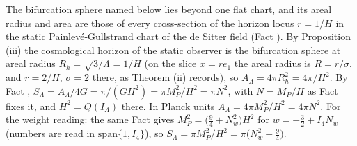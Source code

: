 The bifurcation sphere named below lies beyond one flat chart, and its areal radius and area are those of every cross-section of the horizon locus $r = 1/H$ in the static Painlev\'e-Gullstrand chart of the de Sitter field (Fact ). By Proposition (iii) the cosmological horizon of the static observer is the bifurcation sphere at areal radius $R_{h} = \sqrt{3/\Lambda} = 1/H$ (on the slice $x = re_{1}$ the areal radius is $R = r/\sigma$, and $r = 2/H$, $\sigma = 2$ there, as Theorem (ii) records), so $A_{\Lambda} = 4\pi R_{h}^{2} = 4\pi/H^{2}$. By Fact , $S_{\Lambda} = A_{\Lambda}/4G = \pi/(GH^{2}) = \pi M_{P}^{2}/H^{2} = \pi N^{2}$, with $N = M_{P}/H$ as Fact  fixes it, and $H^{2} = Q(I_{\Lambda})$ there. In Planck units $A_{\Lambda} = 4\pi M_{P}^{2}/H^{2} = 4\pi N^{2}$. For the weight reading: the same Fact gives $M_{P}^{2} = \bigl(\tfrac94 + N_{w}^{2}\bigr)H^{2}$ for $w = -\tfrac32 + I_{4}N_{w}$ (numbers are read in $\mathrm{span}\{1, I_{4}\}$), so $S_{\Lambda} = \pi M_{P}^{2}/H^{2} = \pi\bigl(N_{w}^{2} + \tfrac94\bigr)$.
